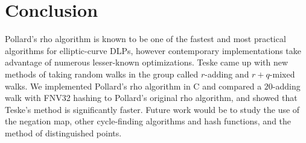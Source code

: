 \documentclass{article}
\newcommand{\ZZ}{\mathbb{Z}}
\newcommand{\NN}{\mathbb{N}}
\newtheorem{defn}[thm]{Definition}
\begin{document}
\iffalse
\begin{defn}
	Let $G$ be a finite cyclic group and $g,h,y \in G$. An \textbf{iterating function} on $G$ is a function $F: G \to G$ such that for any $\alpha,\beta \in \NN_0$ such that $y=g^\alpha h^\beta$ we can efficiently compute $\alpha', \beta' \in \NN_0$ such that $F(y)=g^{\alpha'} h^{\beta'}$.
\end{defn}


\begin{defn}
	Let $G$ be a finite cyclic group, $n \in \NN$, and $M_0, M_1, \ldots, M_{n-1}$ be elements of $G$. Furthermore, let $P$ be a hash function from $G$ to $\ZZ_n$ and $F$ be an iterating function on $G$. A walk $(Y_k)$ with $F$ is called \textbf{$r$-adding} if $F$ is of the form $F(Y) = Y * M_{P(Y)}$ for all $Y \in G$.
\end{defn}
\fi

\section{Conclusion}

Pollard's rho algorithm is known to be one of the fastest and most practical algorithms for elliptic-curve DLPs, however contemporary implementations take advantage of numerous lesser-known optimizations. Teske came up with new methods of taking random walks in the group called $r$-adding and $r+q$-mixed walks. We implemented Pollard's rho algorithm in C and compared a $20$-adding walk with FNV32 hashing to Pollard's original rho algorithm, and showed that Teske's method is significantly faster. Future work would be to study the use of the negation map, other cycle-finding algorithms and hash functions, and the method of distinguished points.

\printbibliography
\end{document}
